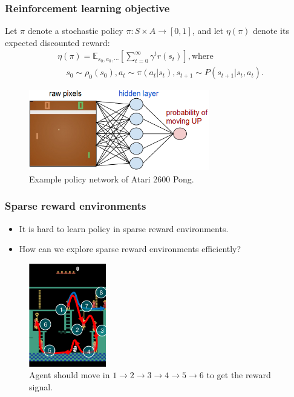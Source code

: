 \documentclass[10pt,mathserif]{beamer}
\begin{document}

\begin{frame}
\frametitle{Reinforcement learning objective}

	Let $\pi$ denote a stochastic policy $\pi : S \times A \rightarrow [0, 1]$, and let $\eta(\pi)$ denote its expected discounted reward:
	\begin{align*}
	&\eta(\pi) = \mathbb{E}_{s_0, a_0, \cdots} \left[ \sum_{t=0}^{\infty} \gamma^t r(s_t) \right], \text{where} \\
	&\quad s_0 \sim \rho_0(s_0), a_t \sim \pi(a_t | s_t), s_{t+1} \sim P(s_{t+1} | s_t, a_t).
	\end{align*}
  \begin{figure}[h]
        \centering
          \includegraphics[width=0.7\textwidth]{emi_figures/pg_policy}
          \caption{Example policy network of Atari 2600 Pong.}
  \end{figure}
\end{frame}


\begin{frame}
\frametitle{Sparse reward environments}
  \begin{itemize} \itemsep=6pt
      \item It is hard to learn policy in sparse reward environments.
      \item How can we explore sparse reward environments efficiently?
  \end{itemize}

  \begin{figure}[h]
        \centering
          \includegraphics[width=0.3\textwidth]{emi_figures/bc_montezuma}
          \caption{Agent should move in $1 \rightarrow 2 \rightarrow 3 \rightarrow 4 \rightarrow 5 \rightarrow 6$ to get the reward signal.}
  \end{figure}
\end{frame}
\end{document}

